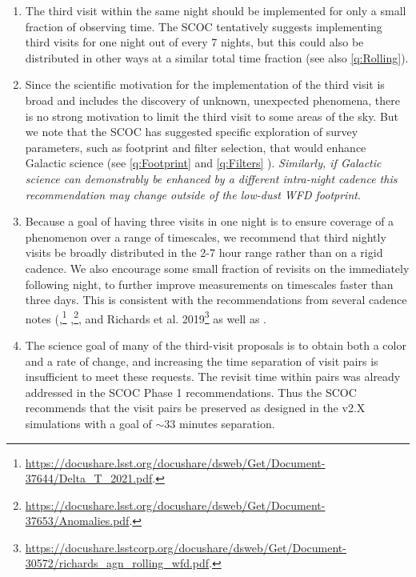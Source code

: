 \begin{enumerate}

\item The third visit within the same night should be implemented for only a small fraction of observing time. The SCOC tentatively suggests implementing third visits for one night out of every 7 nights, but this could also be distributed in other ways at a similar total time fraction (see also \autoref{q:Rolling}).

\item Since the scientific motivation for the implementation of the third visit is broad and includes the discovery of unknown, unexpected phenomena, there is no strong motivation to limit the third visit to some areas of the sky. But we note that the SCOC has suggested specific exploration of survey parameters, such as footprint and filter selection, that would enhance Galactic science (see \autoref{q:Footprint} and \autoref{q:Filters} ). \emph{Similarly, if Galactic science can demonstrably be enhanced by a different intra-night cadence this recommendation may change outside of the low-dust WFD footprint}.


\item Because a goal of having three visits in one night is to ensure coverage of a phenomenon over a range of timescales, we recommend that third nightly visits be broadly distributed in the 2-7 hour range rather than on a rigid cadence.
We also encourage some small fraction of revisits on the immediately following night, to further improve measurements on timescales faster than three days.
This is consistent with the recommendations from several cadence notes (\citealt{2022ApJS..258...13B},\footnote{\url{https://docushare.lsst.org/docushare/dsweb/Get/Document-37644/Delta_T_2021.pdf}.} \citealt{2022ApJS..258....2L},\footnote{\url{https://docushare.lsst.org/docushare/dsweb/Get/Document-37653/Anomalies.pdf}.}, and Richards et al. 2019\footnote{\url{https://docushare.lsstcorp.org/docushare/dsweb/Get/Document-30572/richards_agn_rolling_wfd.pdf}.} as well as \citealt{2019PASP..131f8002B}.


\item 
The science goal of many of the third-visit proposals is to obtain both a color and a rate of change, and increasing the time separation of visit pairs is insufficient to meet these requests.
The revisit time within pairs was already addressed in the SCOC Phase 1 recommendations. Thus the SCOC recommends that the visit pairs be preserved as designed in the v2.X simulations with a goal of $\sim33$ minutes separation.


\end{enumerate}
